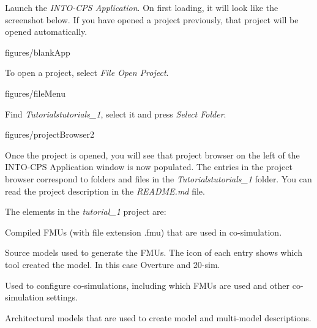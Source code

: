 \documentclass[11pt,a4paper]{../tutorial}
\begin{document}
\begin{instructions}
\item Launch the \emph{INTO-CPS Application}. On first loading, it will look like the screenshot below. If you have opened a project previously, that project will be opened automatically.

\begin{annotation}[width=0.85\linewidth]{figures/blankApp}
\end{annotation}

\item To open a project, select \emph{File \menusep Open Project}.

\begin{annotation}[width=0.85\linewidth,trim=0 260 0 0,clip]{figures/fileMenu}
\end{annotation}

\item Find \emph{Tutorials\pathsep{}tutorials\_1}, select it and press \emph{Select Folder}.

\begin{annotation}[width=0.85\linewidth]{figures/projectBrowser2}
\end{annotation}



\item Once the project is opened, you will see that project browser on the left of the INTO-CPS Application window is now populated. The entries in the project browser correspond to folders and files in the \emph{Tutorials\pathsep{}tutorials\_1} folder.
You can read the project description in the \emph{README.md} file.

    The elements in the \emph{tutorial\_1} project are:

    \begin{description}[noitemsep]
        \item[FMUs] Compiled FMUs (with file extension .fmu) that are used in co-simulation.
        \item[Models] Source models used to generate the FMUs. The icon of each entry shows which tool created the model. In this case Overture and 20-sim.
        \item[Multi-models] Used to configure co-simulations, including which FMUs are used and other co-simulation settings.
        \item[SysML] Architectural models that are used to create model and multi-model descriptions.
    \end{description}


\end{instructions}
\end{document}
